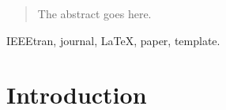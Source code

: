 \documentclass[journal]{IEEEtran}
\theoremstyle{remark}
\theoremstyle{definition}
\begin{document}







\maketitle

\begin{abstract}
The abstract goes here.
\end{abstract}

\begin{IEEEkeywords}
IEEEtran, journal, \LaTeX, paper, template.
\end{IEEEkeywords}






%
\IEEEpeerreviewmaketitle

\def\genmat{\Xi} \def\genvec{\xi}

\section{Introduction}
% 
% 
% 
% 
\end{document}
